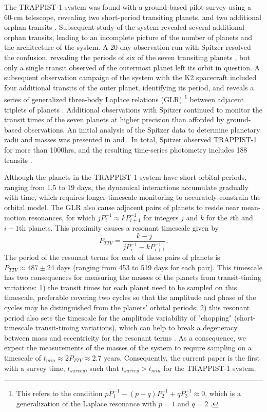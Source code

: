 \documentclass[fleqn,usenatbib]{mnras} %
\begin{document}
The TRAPPIST-1 system was found with a ground-based pilot survey using a 60-cm telescope, 
revealing two short-period transiting planets, and two additional orphan transits 
\citep{Gillon2016, Burdanov2018}.  Subsequent study of the system revealed several 
additional orphan transits, leading to an incomplete picture of the number of planets 
and the architecture of the system.  A 20-day observation run with Spitzer resolved the 
confusion, revealing the periods of six of the seven transiting planets \citep{Gillon2017},
but only a single transit observed of the outermost planet left its orbit in question.  
A subsequent observation campaign of the system with the K2 spacecraft included four 
additional transits of the outer planet, identifying its period, and reveals a series
of generalized three-body Laplace relations (GLR) \footnote{This refers to the condition 
$pP_1^{-1}-(p+q)P_2^{-1}+qP_3^{-1} \approx 0$, which is a generalization of the Laplace 
resonance with $p=1$ and $q=2$ \citep{Papaloizou2014}. } between adjacent triplets of 
planets \citep{Luger2017a}.  Additional observations with Spitzer 
continued to monitor the transit times of the seven planets at higher precision than 
afforded by ground-based observations. An initial analysis of the Spitzer data to determine 
planetary radii and masses was presented in \citet{Delrez2018a} and \citet{Grimm2018}. In total, 
Spitzer observed TRAPPIST-1 for more than 1000hrs, and the resulting time-series photometry 
includes 188 transits \citep{Ducrot2020}.

Although the planets in the TRAPPIST-1 system have short orbital periods, ranging from
1.5 to 19 days, the dynamical interactions accumulate gradually with time, which requires 
longer-timescale monitoring to accurately constrain the orbital model.
The GLR also cause adjacent pairs of planets to reside near mean-motion resonances, 
for which $j P_i^{-1} \approx k P_{i+1}^{-1}$ for integers $j$ and $k$ for the $i$th and $i+1$th planets.  This proximity causes a resonant timescale 
given by
\begin{equation}
    P_{TTV} = \frac{k-j}{j P_i^{-1} - k P_{i+1}^{-1}}.
\end{equation} 
The period of the resonant terms for each of these pairs of planets is $P_{TTV} \approx 487\pm 24$ 
days (ranging from 453 to 519 days for each pair).  This timescale has two consequences for 
measuring the masses of the planets from transit-timing variations:  1)  the transit times 
for each planet need to be sampled on this timescale, preferable covering two cycles so that 
the amplitude and phase of the cycles may be distinguished from the planets' orbital periods; 
2) this resonant period also sets the timescale for the amplitude variability of "chopping" (short-timescale 
transit-timing variations), which can help to break a degeneracy between mass and eccentricity for the resonant terms 
\citep{Lithwick2012,Deck2015}.  As a consequence, we expect the measurements of the masses 
of the system to require sampling on a timescale of $t_{min} \approx 2 P_{TTV} \approx 2.7$ years.  
Consequently, the current paper is the first with a survey time, $t_{survey}$, such that $t_{survey} {>} t_{min}$ for the TRAPPIST-1 system.
\end{document}
